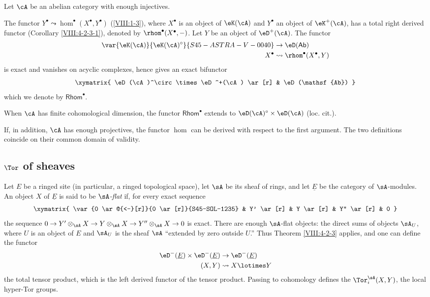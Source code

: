 Let $\cA$ be an abelian category with enough injectives.

The functor $Y^\bullet\leadsto \hom^\bullet(X^\bullet,Y^\bullet)$
(\ref{VIII:1-3}), where $X^\bullet$ is an object of $\eK(\cA)$ and
$Y^\bullet$ an object of $\eK^+(\cA)$, has a total right derived functor
(Corollary \ref{VIII:4-2-3-1}), denoted by
$\rhom^\bullet(X^\bullet,-)$. Let $Y$ be an object of $\eD^+(\cA)$.
The functor
\begin{align*}
  \var{\eK(\cA)}{\eK(\cA)^\circ}{S45-ASTRA-V-0040} &\to \eD(\mathsf{Ab}) \\
  X^\bullet &\leadsto \rhom^\bullet(X^\bullet,Y)
\end{align*}
is exact and vanishes on acyclic complexes, hence gives an exact
bifunctor
\[\xymatrix{
  \eD(\cA)^\circ \times \eD^+(\cA) \ar[r]
    & \eD(\mathsf{Ab})
}\]
which we denote by $\mathsf{Rhom}^\bullet$.

When $\cA$ has finite cohomological dimension, the functor
$\mathsf{Rhom}^\bullet$ extends to
$\eD(\cA)^\circ\times \eD(\cA)$ (loc. cit.).

If, in addition, $\cA$ has enough projectives, the functor $\hom$ can be
derived with respect to the first argument. The two definitions coincide
on their common domain of validity.

\subsection{\texorpdfstring{$\Tor$}{Tor} of sheaves}\label{VIII:6-2}

Let $E$ be a ringed site (in particular, a ringed topological space), let
$\sA$ be its sheaf of rings, and let $\underline E$ be the category of
$\sA$-modules. An object $X$ of $\underline E$ is said to be
\emph{$\sA$-flat} if, for every exact sequence
\[\xymatrix{
  \var{0 \ar@{<-}[r]}{0 \ar[r]}{S45-SOL-1235}
    & Y' \ar[r]
    & Y \ar[r]
    & Y'' \ar[r]
    & 0
}\]
the sequence
$0 \to Y'\otimes_\sA X \to Y\otimes_\sA X \to Y''\otimes_\sA X\to 0$
is exact. There are enough $\sA$-flat objects: the direct sums of objects
$\sA_U$, where $U$ is an object of $E$ and $\sA_U$ is the sheaf $\sA$
“extended by zero outside $U$.” Thus Theorem \ref{VIII:4-2-3} applies,
and one can define the functor
\begin{align*}
  \eD^-(\underline E) \times \eD^-(\underline E) &\to \eD^-(\underline E) \\
  (X,Y) &\leadsto X\lotimes Y
\end{align*}
the total tensor product, which is the left derived functor of the tensor
product. Passing to cohomology defines the $\Tor_i^\sA(X,Y)$, the local
hyper-Tor groups.

